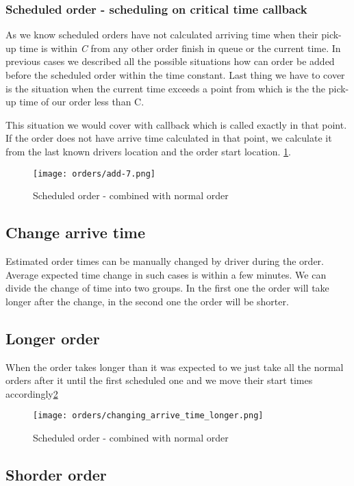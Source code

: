 	\subsubsection{Scheduled order - scheduling on critical time callback}
	As we know scheduled orders have not calculated arriving time when their pick-up time is within \textit{C} from any other order finish in queue or the current time. In previous cases we described all the possible situations how can order be added before the scheduled order within the time constant. Last thing we have to cover is the situation when the current time exceeds a point from which is the the pick-up time of our order less than C.
	
	This situation we would cover with callback which is called exactly in that point. If the order does not have arrive time calculated in that point, we calculate it from the last known drivers location and the order start location. 
	 \ref{order-process-normal-order-combined-with-scheduled}.

	\begin{figure}[h]\centering
		\texttt{[image: orders/add-7.png]}
		\caption{Scheduled order - combined with normal order} 
		\label{order-process-normal-order-combined-with-scheduled}
	\end{figure} 

\subsection{Change arrive time}
	Estimated order times can be manually changed by driver during the order. Average expected time change in such cases is within a few minutes. We can divide the change of time into two groups. In the first one the order will take longer after the change, in the second one the order will be shorter.
	
	\subsection{Longer order}
	When the order takes longer than it was expected to we just take all the normal orders after it until the first scheduled one and we move their start times accordingly\ref{order-process-change_longer}
	\begin{figure}[h]\centering
		\texttt{[image: orders/changing\_arrive\_time\_longer.png]}
		\caption{Scheduled order - combined with normal order} 
		\label{order-process-change_longer}
	\end{figure} 


	
	
	\subsection{Shorder order}
